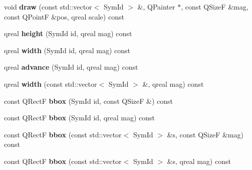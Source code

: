 \begin{DoxyCompactItemize}
\item 
\mbox{\label{class_ms_1_1_score_font_a958ea5500644052d8207d46f92021289}} 
void {\bfseries draw} (const std\+::vector$<$ Sym\+Id $>$ \&, Q\+Painter $\ast$, const Q\+SizeF \&mag, const Q\+PointF \&pos, qreal scale) const
\item 
\mbox{\label{class_ms_1_1_score_font_a396c0841d250145a149a2ae911fa1881}} 
qreal {\bfseries height} (Sym\+Id id, qreal mag) const
\item 
\mbox{\label{class_ms_1_1_score_font_a76981900d57807ccce490f1f25dfa31e}} 
qreal {\bfseries width} (Sym\+Id id, qreal mag) const
\item 
\mbox{\label{class_ms_1_1_score_font_a198c1b334c31dc4a893d31870fda5cf3}} 
qreal {\bfseries advance} (Sym\+Id id, qreal mag) const
\item 
\mbox{\label{class_ms_1_1_score_font_aeeba6ffeb9ad8617a44fad63a1e62439}} 
qreal {\bfseries width} (const std\+::vector$<$ Sym\+Id $>$ \&, qreal mag) const
\item 
\mbox{\label{class_ms_1_1_score_font_a5a260d507297a8c370ce87480e66d93b}} 
const Q\+RectF {\bfseries bbox} (Sym\+Id id, const Q\+SizeF \&) const
\item 
\mbox{\label{class_ms_1_1_score_font_a10d985a1c2ccf31863bbe09b48634c6c}} 
const Q\+RectF {\bfseries bbox} (Sym\+Id id, qreal mag) const
\item 
\mbox{\label{class_ms_1_1_score_font_a5c95b0953a3476c54e48df1205c4816b}} 
const Q\+RectF {\bfseries bbox} (const std\+::vector$<$ Sym\+Id $>$ \&s, const Q\+SizeF \&mag) const
\item 
\mbox{\label{class_ms_1_1_score_font_a75629c7d49bc0733c5507c5276965f8f}} 
const Q\+RectF {\bfseries bbox} (const std\+::vector$<$ Sym\+Id $>$ \&s, qreal mag) const
\item 
\mbox{\label{class_ms_1_1_score_font_ab5c1fd7b22507c0d064551d21ae99fb5}} 

\end{DoxyCompactItemize}

